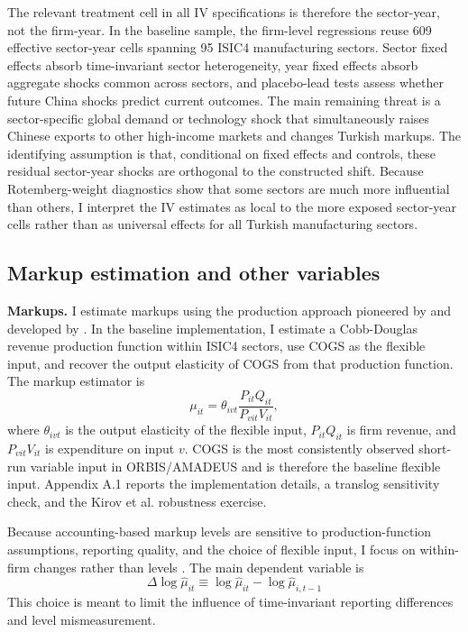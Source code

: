 \documentclass[12pt]{article}
\begin{document}
The relevant treatment cell in all IV specifications is therefore the sector-year, not the firm-year. In the baseline sample, the firm-level regressions reuse 609 effective sector-year cells spanning 95 ISIC4 manufacturing sectors. Sector fixed effects absorb time-invariant sector heterogeneity, year fixed effects absorb aggregate shocks common across sectors, and placebo-lead tests assess whether future China shocks predict current outcomes. The main remaining threat is a sector-specific global demand or technology shock that simultaneously raises Chinese exports to other high-income markets and changes Turkish markups. The identifying assumption is that, conditional on fixed effects and controls, these residual sector-year shocks are orthogonal to the constructed shift. Because Rotemberg-weight diagnostics show that some sectors are much more influential than others, I interpret the IV estimates as local to the more exposed sector-year cells rather than as universal effects for all Turkish manufacturing sectors.


\subsection{Markup estimation and other variables}

\textbf{Markups.} I estimate markups using the production approach pioneered by \textcite{hallRelationPriceMarginal1988} and developed by \textcite{deloeckerMarkupsFirmLevelExport2012}. In the baseline implementation, I estimate a Cobb-Douglas revenue production function within ISIC4 sectors, use COGS as the flexible input, and recover the output elasticity of COGS from that production function. The markup estimator is
\[
\mu_{it} = \theta_{ivt} \frac{P_{it}Q_{it}}{P_{vit}V_{it}},
\]
where $\theta_{ivt}$ is the output elasticity of the flexible input, $P_{it}Q_{it}$ is firm revenue, and $P_{vit}V_{it}$ is expenditure on input $v$. COGS is the most consistently observed short-run variable input in ORBIS/AMADEUS and is therefore the baseline flexible input. Appendix A.1 reports the implementation details, a translog sensitivity check, and the Kirov et al. robustness exercise.

Because accounting-based markup levels are sensitive to production-function assumptions, reporting quality, and the choice of flexible input, I focus on within-firm changes rather than levels \parencite{deridderHitchhikersGuideMarkup2026}. The main dependent variable is
\[
\Delta \log \hat{\mu}_{it} \equiv \log \hat{\mu}_{it} - \log \hat{\mu}_{i,t-1}
\]
This choice is meant to limit the influence of time-invariant reporting differences and level mismeasurement.
\end{document}
